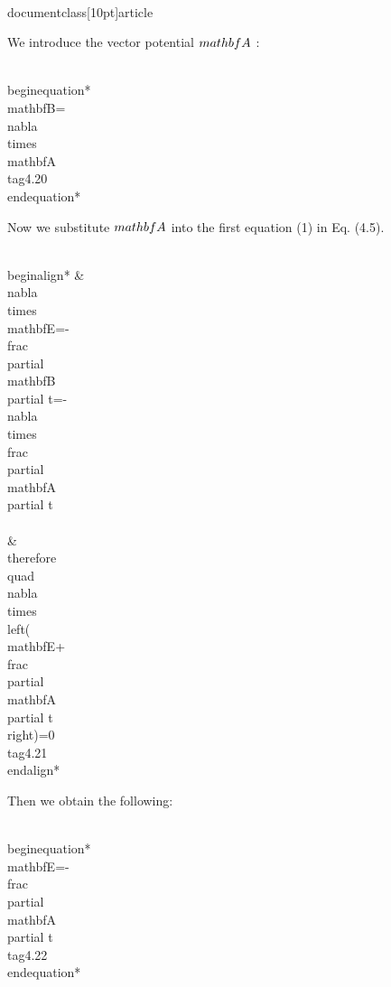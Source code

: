 \\documentclass[10pt]{article}
\begin{document}
We introduce the vector potential $\\mathbf{A}$ :


\\begin{equation*}
\\mathbf{B}=\\nabla \\times \\mathbf{A} \\tag{4.20}
\\end{equation*}


Now we substitute $\\mathbf{A}$ into the first equation (1) in Eq. (4.5).


\\begin{align*}
& \\nabla \\times \\mathbf{E}=-\\frac{\\partial \\mathbf{B}}{\\partial t}=-\\nabla \\times \\frac{\\partial \\mathbf{A}}{\\partial t} \\\\
& \\therefore \\quad \\nabla \\times\\left(\\mathbf{E}+\\frac{\\partial \\mathbf{A}}{\\partial t}\\right)=0 \\tag{4.21}
\\end{align*}


Then we obtain the following:


\\begin{equation*}
\\mathbf{E}=-\\frac{\\partial \\mathbf{A}}{\\partial t} \\tag{4.22}
\\end{equation*}
\end{document}
